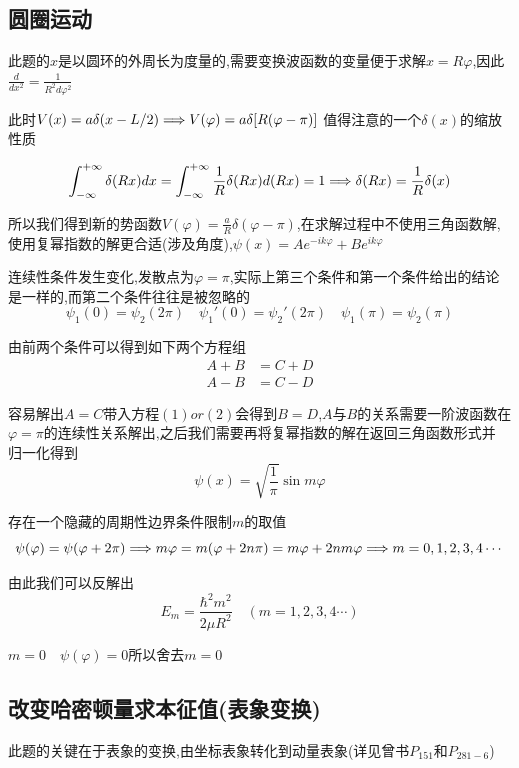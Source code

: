         \subsection{圆圈运动}

        此题的$x$是以圆环的外周长为度量的,需要变换波函数的变量便于求解$x=R\varphi$,因此$\frac{d}{dx^{2}}=\frac{1}{R^{2}d\varphi^{2}}$

        此时$V(x)=a\delta(x-L/2) \Longrightarrow V(\varphi) = a \delta[R(\varphi-\pi)]$
        值得注意的一个$\delta(x)$的缩放性质
        \begin{formal}
            $$ \int_{-\infty}^{+\infty} \delta(Rx)dx = \int_{-\infty}^{+\infty} \frac{1}{R} \delta(Rx) d(Rx) = 1 \Longrightarrow \delta(Rx) = \frac{1}{R}\delta(x)$$
        \end{formal}

        所以我们得到新的势函数$V(\varphi) = \frac{a}{R} \delta(\varphi-\pi) $,在求解过程中不使用三角函数解,使用复幂指数的解更合适(涉及角度),\quad $\psi(x) = Ae^{-ik\varphi} + Be^{ik\varphi}$

        连续性条件发生变化,发散点为$\varphi = \pi$,实际上第三个条件和第一个条件给出的结论是一样的,而第二个条件往往是被忽略的
        $$ \psi_{1}(0) = \psi_{2}(2\pi) \quad \psi_{1}'(0) = \psi_{2}'(2\pi)\quad \psi_{1}(\pi) = \psi_{2}(\pi) $$
        
        由前两个条件可以得到如下两个方程组
        \begin{align}
            A+B&=C+D\\
            A-B&=C-D
        \end{align}

        容易解出$A=C$带入方程$(1)or(2)$会得到$B=D$,$A$与$B$的关系需要一阶波函数在$\varphi=\pi$的连续性关系解出,之后我们需要再将复幂指数的解在返回三角函数形式并
        归一化得到
        $$ \psi(x) = \sqrt{\frac{1}{\pi}} \sin{m \varphi} $$
        
        存在一个隐藏的周期性边界条件限制$m$的取值
        $$ \psi(\varphi) = \psi(\varphi+2\pi) \Longrightarrow m\varphi = m(\varphi+2n\pi) = m \varphi + 2nm\varphi  \Longrightarrow m = 0,1,2,3,4\cdots $$
        
        由此我们可以反解出
        $$ E_{m} = \frac{\hbar^{2} m^{2}}{2\mu R^{2}} \quad (m=1,2,3,4\cdots)$$

        $ m = 0 \quad \psi(\varphi) = 0 $所以舍去$m=0$

        \subsection{改变哈密顿量求本征值(表象变换)}
            此题的关键在于表象的变换,由坐标表象转化到动量表象(详见曾书$P_{151}$和$P_{281-6}$)
            
